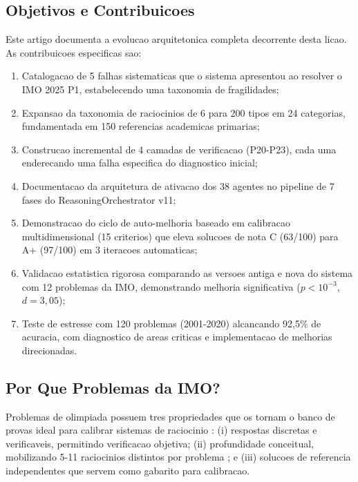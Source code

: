 \documentclass[5p]{elsarticle}
\begin{document}
\subsection{Objetivos e Contribuicoes}

Este artigo documenta a evolucao arquitetonica completa decorrente desta licao.
As contribuicoes especificas sao:

\begin{enumerate}[label=(\roman*)]
  \item Catalogacao de 5 falhas sistematicas que o sistema apresentou ao
    resolver o IMO 2025 P1, estabelecendo uma taxonomia de fragilidades;
  \item Expansao da taxonomia de raciocinios de 6 para 200 tipos em 24
    categorias, fundamentada em 150 referencias academicas primarias;
  \item Construcao incremental de 4 camadas de verificacao (P20-P23), cada
    uma enderecando uma falha especifica do diagnostico inicial;
  \item Documentacao da arquitetura de ativacao dos 38 agentes no pipeline
    de 7 fases do ReasoningOrchestrator v11;
  \item Demonstracao do ciclo de auto-melhoria baseado em calibracao
    multidimensional (15 criterios) que eleva solucoes de nota C (63/100)
    para A+ (97/100) em 3 iteracoes automaticas;
  \item Validacao estatistica rigorosa comparando as versoes antiga e nova do
    sistema com 12 problemas da IMO, demonstrando melhoria significativa
    ($p<10^{-3}$, $d=3,05$);
  \item Teste de estresse com 120 problemas (2001-2020) alcancando 92,5\%
    de acuracia, com diagnostico de areas criticas e implementacao de
    melhorias direcionadas.
\end{enumerate}

\subsection{Por Que Problemas da IMO?}

Problemas de olimpiada possuem tres propriedades que os tornam o banco de provas
ideal para calibrar sistemas de raciocinio \cite{engel1998,zeitz2006,tao2006}:
(i) respostas discretas e verificaveis, permitindo verificacao objetiva;
(ii) profundidade conceitual, mobilizando 5-11 raciocinios distintos por
problema \cite{polya1945}; e (iii) solucoes de referencia independentes
\cite{chen2025,deepmind2025} que servem como gabarito para calibracao.
\end{document}
